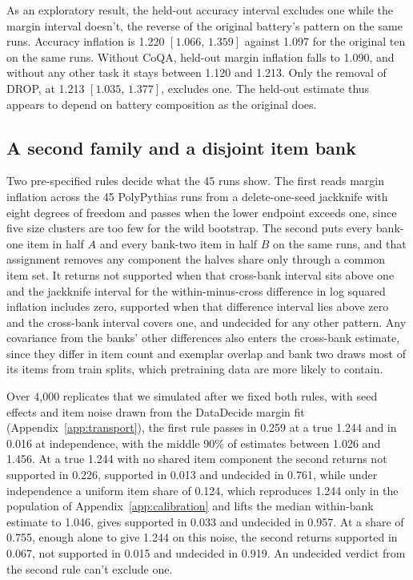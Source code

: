 \documentclass{article}
\newcommand{\ci}[2]{\ensuremath{[#1,\,#2]}}
\begin{document}
As an exploratory result, the held-out accuracy interval excludes one while the margin interval doesn't, the reverse of the original battery's pattern on the same runs. Accuracy inflation is 1.220 \ci{1.066}{1.359} against 1.097 for the original ten on the same runs. Without CoQA, held-out margin inflation falls to 1.090, and without any other task it stays between 1.120 and 1.213. Only the removal of DROP, at 1.213 \ci{1.035}{1.377}, excludes one. The held-out estimate thus appears to depend on battery composition as the original does.

\subsection{A second family and a disjoint item bank}
\label{sec:family}
Two pre-specified rules decide what the 45 runs show. The first reads margin inflation across the 45 PolyPythias runs from a delete-one-seed jackknife with eight degrees of freedom and passes when the lower endpoint exceeds one, since five size clusters are too few for the wild bootstrap. The second puts every bank-one item in half $A$ and every bank-two item in half $B$ on the same runs, and that assignment removes any component the halves share only through a common item set. It returns not supported when that cross-bank interval sits above one and the jackknife interval for the within-minus-cross difference in log squared inflation includes zero, supported when that difference interval lies above zero and the cross-bank interval covers one, and undecided for any other pattern. Any covariance from the banks' other differences also enters the cross-bank estimate, since they differ in item count and exemplar overlap and bank two draws most of its items from train splits, which pretraining data are more likely to contain.

Over 4,000 replicates that we simulated after we fixed both rules, with seed effects and item noise drawn from the DataDecide margin fit (Appendix~\ref{app:transport}), the first rule passes in 0.259 at a true 1.244 and in 0.016 at independence, with the middle 90\% of estimates between 1.026 and 1.456. At a true 1.244 with no shared item component the second returns not supported in 0.226, supported in 0.013 and undecided in 0.761, while under independence a uniform item share of 0.124, which reproduces 1.244 only in the population of Appendix~\ref{app:calibration} and lifts the median within-bank estimate to 1.046, gives supported in 0.033 and undecided in 0.957. At a share of 0.755, enough alone to give 1.244 on this noise, the second returns supported in 0.067, not supported in 0.015 and undecided in 0.919. An undecided verdict from the second rule can't exclude one.
\end{document}
